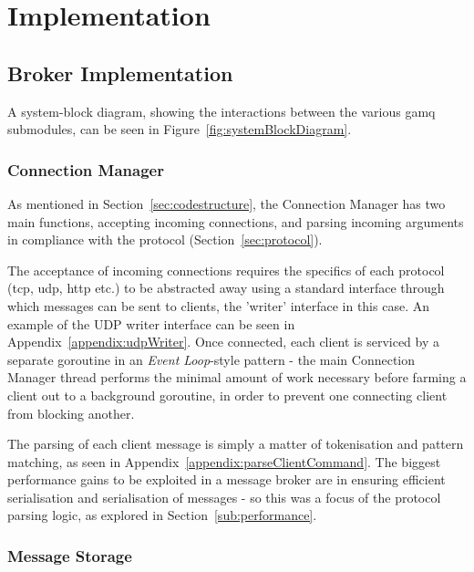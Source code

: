 \chapter{Implementation}
\label{chap:Implementation}

\section{Broker Implementation}
\label{sec:Broker Implementation}

A system-block diagram, showing the interactions between the various \gls{gamq}
submodules, can be seen in Figure~\ref{fig:systemBlockDiagram}.

\subsection{Connection Manager}
\label{sub:connectionManager}

As mentioned in Section~\ref{sec:codestructure}, the Connection Manager has two
main functions, accepting incoming connections, and parsing incoming arguments
in compliance with the protocol (Section~\ref{sec:protocol}).

The acceptance of incoming connections requires the specifics of each protocol
(\gls{tcp}, \gls{udp}, \gls{http} etc.) to be abstracted away using a standard
interface through which messages can be sent to clients, the 'writer' interface
in this case. An example of the UDP writer interface can be seen in
Appendix~\ref{appendix:udpWriter}. Once connected, each client is serviced by a
separate \gls{goroutine} in an \emph{Event Loop}-style pattern - the main
Connection Manager thread performs the minimal amount of work necessary before
farming a client out to a background \gls{goroutine}, in order to prevent one
connecting client from blocking another.

The parsing of each client message is simply a matter of tokenisation and
pattern matching, as seen in Appendix~\ref{appendix:parseClientCommand}. The
biggest performance gains to be exploited in a message broker are in ensuring
efficient serialisation and serialisation of messages - so this was a focus of
the protocol parsing logic, as explored in Section~\ref{sub:performance}.


\subsection{Message Storage}
\label{sub:messageStorage}

